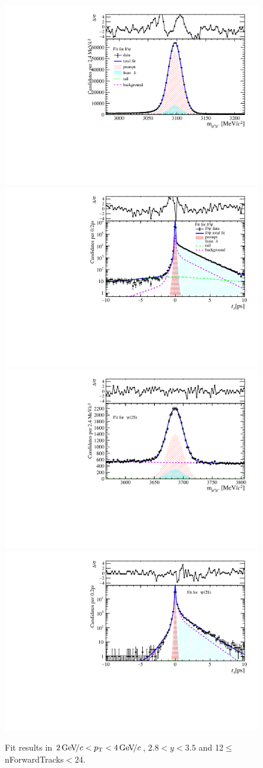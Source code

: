 \begin{figure}[H]
\begin{center}
\includegraphics[width=0.47\linewidth]{pdf/Jpsi/drawmassF/n2y2pt2.pdf}
\includegraphics[width=0.47\linewidth]{pdf/Jpsi/2DFitF/n2y2pt2.pdf}
\vspace*{-0.5cm}
\includegraphics[width=0.47\linewidth]{pdf/Psi2S/drawmassF/n2y2pt2.pdf}
\includegraphics[width=0.47\linewidth]{pdf/Psi2S/2DFitF/n2y2pt2.pdf}
\vspace*{-0.5cm}
\end{center}
\caption{Fit results in $2\text{\,Ge\kern -0.1em V\!/}c<p_{\mathrm{T}}<4\text{\,Ge\kern -0.1em V\!/}c$, $2.8<y<3.5$ and 12$\leq$nForwardTracks$<$24.}
\label{Fitn2y2pt2}
\end{figure}
